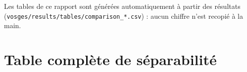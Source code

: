 \documentclass[11pt,a4paper]{article}
\begin{document}
Les tables de ce rapport sont générées automatiquement à partir des résultats
(\texttt{vosges/results/tables/comparison\_*.csv}) : aucun chiffre n'est recopié à la main.

\section{Table complète de séparabilité}


\end{document}
